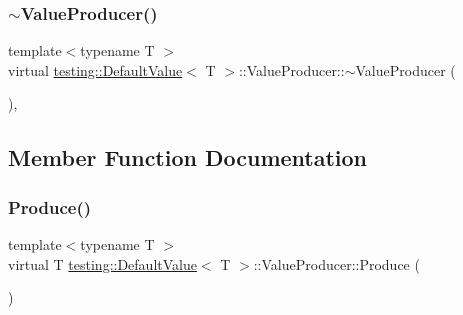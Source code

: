 \subsubsection{\texorpdfstring{$\sim$ValueProducer()}{~ValueProducer()}\hspace{0.1cm}{\footnotesize\ttfamily [3/3]}}
{\footnotesize\ttfamily template$<$typename T $>$ \\
virtual \mbox{\hyperlink{classtesting_1_1_default_value}{testing\+::\+Default\+Value}}$<$ T $>$\+::Value\+Producer\+::$\sim$\+Value\+Producer (\begin{DoxyParamCaption}{ }\end{DoxyParamCaption})\hspace{0.3cm}{\ttfamily [inline]}, {\ttfamily [virtual]}}



\subsection{Member Function Documentation}
\mbox{\label{classtesting_1_1_default_value_1_1_value_producer_adb9e38abe068ac2e792b53fd32bd7e96}} 
\subsubsection{\texorpdfstring{Produce()}{Produce()}\hspace{0.1cm}{\footnotesize\ttfamily [1/3]}}
{\footnotesize\ttfamily template$<$typename T $>$ \\
virtual T \mbox{\hyperlink{classtesting_1_1_default_value}{testing\+::\+Default\+Value}}$<$ T $>$\+::Value\+Producer\+::\+Produce (\begin{DoxyParamCaption}{ }\end{DoxyParamCaption})\hspace{0.3cm}{\ttfamily [pure virtual]}}



